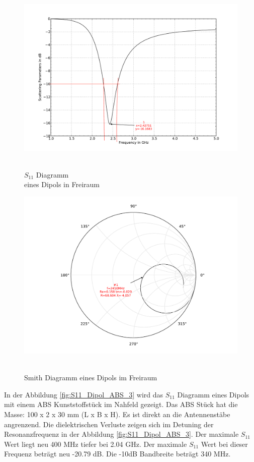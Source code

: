 \begin{figure}[!ht]
\begin{center}
  \includegraphics[width=\linewidth]{content/bilder/Evaluation/Dipol/S11DipolOhneABS.pdf}
  \caption{\\$S_{11}$ Diagramm \\eines Dipols in Freiraum}\label{fig:S11_Dipol_freiraum_1}
\endminipage%
{}
  \includegraphics[width=\linewidth]{content/bilder/Evaluation/Dipol/SmithDipolOhneABS.pdf}
  \caption{\\Smith Diagramm eines Dipols im Freiraum}\label{fig:Smith_Dipol_freiraum_2}
\endminipage
\end{center}
\end{figure}

In der Abbildung \ref{fig:S11_Dipol_ABS_3} wird das $S_{11}$ Diagramm eines Dipols mit einem ABS Kunststoffstück im Nahfeld gezeigt. Das ABS Stück hat die Masse: 100 x 2 x 30 mm (L x B x H). Es ist direkt an die Antennenstäbe angrenzend. Die dielektrischen Verluste zeigen sich im Detuning der Resonanzfrequenz in der Abbildung \ref{fig:S11_Dipol_ABS_3}. Der maximale $S_{11}$ Wert liegt neu 400 MHz tiefer bei 2.04 GHz. Der maximale $S_{11}$ Wert bei dieser Frequenz beträgt  neu -20.79 dB. Die -10dB Bandbreite beträgt 340 MHz.\\

